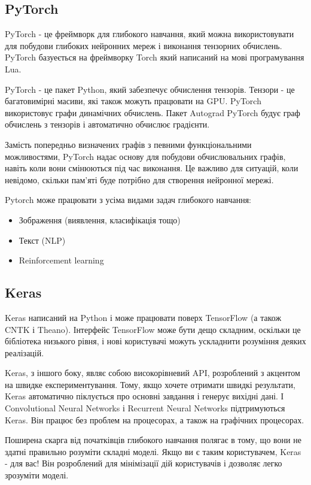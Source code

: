 \subsection{PyTorch}
PyTorch - це фреймворк для глибокого навчання, який можна використовувати для побудови глибоких нейронних мереж і виконання тензорних обчислень. PyTorch базуеється на фреймворку Torch який написаний на мові програмування Lua.

PyTorch - це пакет Python, який забезпечує обчислення тензорів. Тензори - це багатовимірні масиви, які також можуть працювати на GPU. PyTorch використовує графи динамічних обчислень. Пакет Autograd PyTorch будує граф обчислень з тензорів і автоматично обчислює градієнти.

Замість попередньо визначених графів з певними функціональними можливостями, PyTorch надає основу для побудови обчислювальних графів, навіть коли вони смінюються під час виконання. Це важливо для ситуацій, коли невідомо, скільки пам'яті буде потрібно для створення нейронної мережі.

Pytorch може працювати з усіма видами задач глибокого навчання:

\begin{itemize}
    \item Зображення (виявлення, класифікація тощо)
    \item Текст (NLP)
    \item Reinforcement learning
\end{itemize}


\subsection{Keras}
Keras написаний на Python і може працювати поверх TensorFlow (а також CNTK і Theano). Інтерфейс TensorFlow може бути дещо складним, оскільки це бібліотека низького рівня, і нові користувачі можуть ускладнити розуміння деяких реалізацій.

Keras, з іншого боку, являє собою високорівневий API, розроблений з акцентом на швидке експериментування. Тому, якщо хочете отримати швидкі результати, Keras автоматично піклується про основні завдання і генерує вихідні дані. І Convolutional Neural Networks і Recurrent Neural Networks підтримуються Keras. Він працює без проблем на процесорах, а також на графічних процесорах.

Поширена скарга від початківців глибокого навчання полягає в тому, що вони не здатні правильно розуміти складні моделі. Якщо ви є таким користувачем, Keras - для вас! Він розроблений для мінімізації дій користувачів і дозволяє легко зрозуміти моделі.


